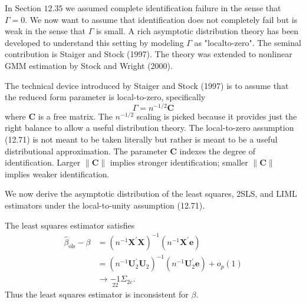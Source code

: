\documentclass[10pt]{article}
\begin{document}
In Section $12.35$ we assumed complete identification failure in the sense that $\Gamma=0$. We now want to assume that identification does not completely fail but is weak in the sense that $\Gamma$ is small. A rich asymptotic distribution theory has been developed to understand this setting by modeling $\Gamma$ as "localto-zero". The seminal contribution is Staiger and Stock (1997). The theory was extended to nonlinear GMM estimation by Stock and Wright (2000).

The technical device introduced by Staiger and Stock (1997) is to assume that the reduced form parameter is local-to-zero, specifically
$$
\Gamma=n^{-1 / 2} \boldsymbol{C}
$$
where $\boldsymbol{C}$ is a free matrix. The $n^{-1 / 2}$ scaling is picked because it provides just the right balance to allow a useful distribution theory. The local-to-zero assumption (12.71) is not meant to be taken literally but rather is meant to be a useful distributional approximation. The parameter $\boldsymbol{C}$ indexes the degree of identification. Larger $\|\boldsymbol{C}\|$ implies stronger identification; smaller $\|\boldsymbol{C}\|$ implies weaker identification.

We now derive the asymptotic distribution of the least squares, 2SLS, and LIML estimators under the local-to-unity assumption (12.71).

The least squares estimator satisfies
$$
\begin{aligned}
\widehat{\beta}_{\mathrm{ols}}-\beta &=\left(n^{-1} \boldsymbol{X}^{\prime} \boldsymbol{X}\right)^{-1}\left(n^{-1} \boldsymbol{X}^{\prime} \boldsymbol{e}\right) \\
&=\left(n^{-1} \boldsymbol{U}_{2}^{\prime} \boldsymbol{U}_{2}\right)^{-1}\left(n^{-1} \boldsymbol{U}_{2}^{\prime} \boldsymbol{e}\right)+o_{p}(1) \\
& \longrightarrow \underset{22}{-1} \Sigma_{2 e} .
\end{aligned}
$$
Thus the least squares estimator is inconsistent for $\beta$.
\end{document}
